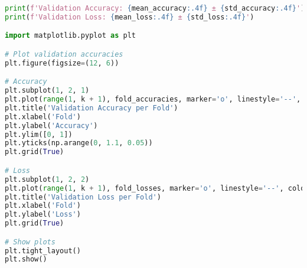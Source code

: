 \begin{lstlisting}[language=Python]
print(f'Validation Accuracy: {mean_accuracy:.4f} ± {std_accuracy:.4f}')
print(f'Validation Loss: {mean_loss:.4f} ± {std_loss:.4f}')

import matplotlib.pyplot as plt

# Plot validation accuracies
plt.figure(figsize=(12, 6))

# Accuracy
plt.subplot(1, 2, 1)
plt.plot(range(1, k + 1), fold_accuracies, marker='o', linestyle='--', color='b')
plt.title('Validation Accuracy per Fold')
plt.xlabel('Fold')
plt.ylabel('Accuracy')
plt.ylim([0, 1])
plt.yticks(np.arange(0, 1.1, 0.05))
plt.grid(True)

# Loss
plt.subplot(1, 2, 2)
plt.plot(range(1, k + 1), fold_losses, marker='o', linestyle='--', color='r')
plt.title('Validation Loss per Fold')
plt.xlabel('Fold')
plt.ylabel('Loss')
plt.grid(True)

# Show plots
plt.tight_layout()
plt.show()

\end{lstlisting}

